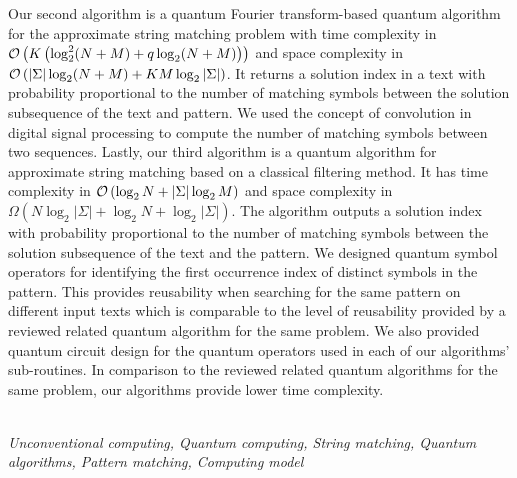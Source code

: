 Our second algorithm is a quantum Fourier transform-based quantum algorithm for the approximate string matching problem with time complexity in $\mathcal{O}\left( K\left(\log_2^2 (N+M) + q\log_2 (N+M) \right) \right)$ and space complexity in $\mathcal{O}\left(\vert \Sigma \vert\log_2 (N+M) + KM\log_2 \vert \Sigma \vert \right)$. It returns a solution index in a text with probability proportional to the number of matching symbols between the solution subsequence of the text and pattern.  We used the concept of convolution in digital signal processing to compute the number of matching symbols between two sequences. Lastly, our third algorithm is a quantum algorithm for approximate string matching based on a classical filtering method. It has time complexity in $\mathcal{O}\left( \log_2 N + \vert \Sigma \vert\log_2 M \right)$ and space complexity in $\Omega\left( N\log_2\vert \Sigma \vert + \log_2 N + \log_2 \vert \Sigma \vert \right)$. The algorithm outputs a solution index with probability proportional to the number of matching symbols between the solution subsequence of the text and the pattern. We designed quantum symbol operators for identifying the first occurrence index of distinct symbols in the pattern. This provides reusability when searching for the same pattern on different input texts which is comparable to the level of reusability provided by a reviewed related quantum algorithm for the same problem. We also provided quantum circuit design for the quantum operators used in each of our algorithms' sub-routines. In comparison to the reviewed related quantum algorithms for the same problem, our algorithms provide lower time complexity. 



 



~\\
 \textit{Unconventional computing, Quantum computing, String matching, Quantum algorithms, Pattern matching, Computing model}

